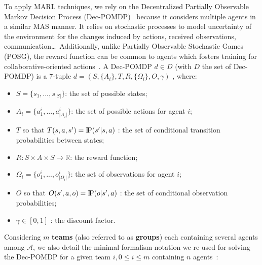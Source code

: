\documentclass[sn-mathphys-num]{sn-jnl}%
\newcommand{\probP}{\text{I\kern-0.15em P}}
\theoremstyle{thmstyleone}%
\theoremstyle{thmstyletwo}%
\theoremstyle{thmstylethree}%
\begin{document}
To apply MARL techniques, we rely on the Decentralized Partially Observable Markov Decision Process (Dec-POMDP)~\cite{Oliehoek2016} because it considers multiple agents in a similar MAS manner. It relies on stochastic processes to model uncertainty of the environment for the changes induced by actions, received observations, communication\dots \ Additionally, unlike Partially Observable Stochastic Games (POSG), the reward function can be common to agents which fosters training for collaborative-oriented actions~\cite{Beynier2013}.
A Dec-POMDP $d \in D$ (with $D$ the set of Dec-POMDP) is a 7-tuple $d = (S,\{A_i\},T,R,\{\Omega_i\},O,\gamma)$ , where:
\begin{itemize}
    \item $S = \{s_1,...,s_{|S|}\}$: the set of possible states;
    \item $A_{i} = \{a_{1}^{i},...,a_{|A_{i}|}^{i}\}$: the set of possible actions for agent $i$;
    \item $T$ so that $T(s,a,s') = \probP{(s'|s,a)}$ : the set of conditional transition probabilities between states;
    \item $R: S \times A \times S \rightarrow \mathbb{R}$: the reward function;
    \item $\Omega_{i} = \{o_{1}^{i},...,o_{|\Omega_{i}|}^{i}\}$: the set of observations for agent $i$;
    \item $O$ so that $O(s',a,o) = \probP{(o|s',a)}$ : the set of conditional observation probabilities;
    \item $\gamma \in [0,1]$ : the discount factor.
\end{itemize}

Considering $m$ \textbf{teams} (also referred to as \textbf{groups}) each containing several agents among $\mathcal{A}$, we also detail the minimal formalism notation we re-used for solving the Dec-POMDP for a given team $i, 0 \leq i \leq m$ containing $n$ agents~\cite{Beynier2013,Albrecht2024}:
\end{document}
